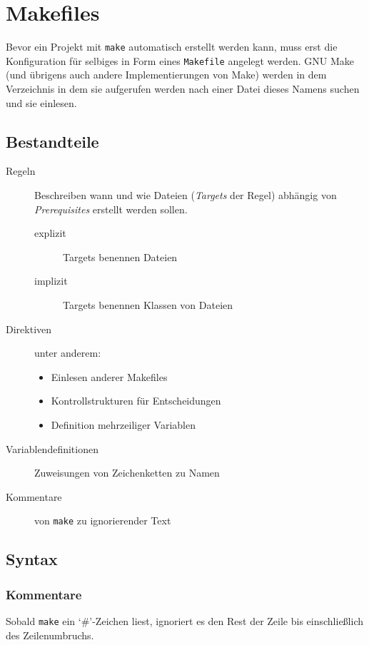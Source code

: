 \section{Makefiles}

Bevor ein Projekt mit \texttt{make} automatisch erstellt werden kann, muss erst
die Konfiguration für selbiges in Form eines \texttt{Makefile} angelegt werden.
GNU Make (und übrigens auch andere Implementierungen von Make) werden in dem
Verzeichnis in dem sie aufgerufen werden nach einer Datei dieses Namens suchen
und sie einlesen.

\subsection{Bestandteile}

\begin{description}
%
	\item[Regeln] Beschreiben wann und wie Dateien (\emph{Targets} der Regel)
	abhängig von \emph{Prerequisites} erstellt werden sollen.
	\begin{description}
		\item[explizit] Targets benennen Dateien
		\item[implizit] Targets benennen Klassen von Dateien
	\end{description}
%
	\item[Direktiven] unter anderem:
	\begin{itemize}
		\item Einlesen anderer Makefiles
		\item Kontrollstrukturen für Entscheidungen
		\item Definition mehrzeiliger Variablen
	\end{itemize}
%
	\item[Variablendefinitionen] Zuweisungen von Zeichenketten zu Namen
%
	\item[Kommentare] von \texttt{make} zu ignorierender Text
\end{description}

\subsection{Syntax}

	\subsubsection*{Kommentare}  
		
		Sobald \texttt{make} ein `\#'-Zeichen liest, ignoriert es den Rest der Zeile
		bis einschließlich des Zeilenumbruchs.

